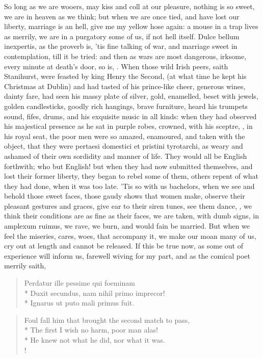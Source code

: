 So long as we are wooers, may kiss and coll at our pleasure, nothing is
so sweet, we are in heaven as we think; but when we are once tied, and
have lost our liberty, marriage is an hell, give me my yellow hose
again: a mouse in a trap lives as merrily, we are in a purgatory some
of us, if not hell itself. Dulce bellum inexpertis, as the proverb is,
'tis fine talking of war, and marriage sweet in contemplation, till it
be tried: and then as wars are most dangerous, irksome, every minute at
death's door, so is, \etc{}. When those wild Irish peers, saith
Stanihurst, were feasted by king Henry the Second, (at what time
he kept his Christmas at Dublin) and had tasted of his prince-like
cheer, generous wines, dainty fare, had seen his massy plate of
silver, gold, enamelled, beset with jewels, golden candlesticks, goodly
rich hangings, brave furniture, heard his trumpets sound, fifes, drums,
and his exquisite music in all kinds: when they had observed his
majestical presence as he sat in purple robes, crowned, with his
sceptre, \etc{}, in his royal seat, the poor men were so amazed,
enamoured, and taken with the object, that they were pertaesi domestici
et pristini tyrotarchi, as weary and ashamed of their own sordidity and
manner of life. They would all be English forthwith; who but English!
but when they had now submitted themselves, and lost their former
liberty, they began to rebel some of them, others repent of what they
had done, when it was too late. 'Tis so with us bachelors, when we see
and behold those sweet faces, those gaudy shows that women make,
observe their pleasant gestures and graces, give ear to their siren
tunes, see them dance, \etc{}, we think their conditions are as fine as
their faces, we are taken, with dumb signs, in amplexum ruimus, we
rave, we burn, and would fain be married. But when we feel the
miseries, cares, woes, that accompany it, we make our moan many of us,
cry out at length and cannot be released. If this be true now, as some
out of experience will inform us, farewell wiving for my part, and as
the comical poet merrily saith,
%
\begin{latin}%
\begin{verse}%
Perdatur ille pessime qui foeminam\\*
Duxit secundus, nam nihil primo imprecor!\\*
Ignarus ut puto mali primus fuit.
\end{verse}%
\end{latin}%
\translationrule%
\begin{verse}%
Foul fall him that brought the second match to pass,\\*
The first I wish no harm, poor man alas!\\*
He knew not what he did, nor what it was.\\!
\end{verse}%
%

